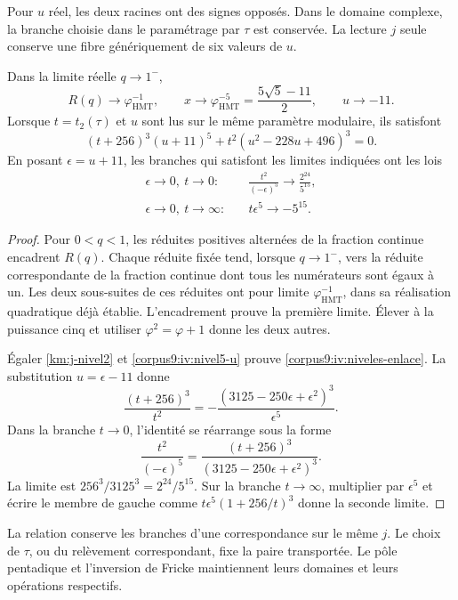 Pour \(u\) réel, les deux racines ont des signes opposés. Dans le
domaine complexe, la branche choisie dans le paramétrage
par \(\tau\) est conservée. La lecture \(j\) seule conserve une fibre
génériquement de six valeurs de \(u\).


\begin{proposition}
\label{corpus9:iv:niveles-ramas}
Dans la limite réelle \(q\to1^-\),
\[
 R(q)\longrightarrow\varphi_{\mathrm{HMT}}^{-1},\qquad
 x\longrightarrow\varphi_{\mathrm{HMT}}^{-5}
     =\frac{5\sqrt5-11}{2},\qquad u\longrightarrow-11.
\]
Lorsque \(t=t_2(\tau)\) et \(u\) sont lus sur le même paramètre
modulaire, ils satisfont
\begin{equation}
 (t+256)^3(u+11)^5
   +t^2(u^2-228u+496)^3=0.
 \label{corpus9:iv:niveles-enlace}
\end{equation}
En posant \(\epsilon=u+11\), les branches qui satisfont les limites
indiquées ont les lois
\begin{align}
 \epsilon\to0,\ t\to0:
 &\quad \frac{t^2}{(-\epsilon)^5}\longrightarrow
          \frac{2^{24}}{5^{15}},\\
 \epsilon\to0,\ t\to\infty:
 &\quad t\epsilon^5\longrightarrow-5^{15}.
 \label{corpus9:iv:niveles-asintotica}
\end{align}
\end{proposition}
\begin{proof}
Pour \(0<q<1\), les réduites positives alternées de la
fraction continue encadrent \(R(q)\). Chaque réduite fixée
tend, lorsque \(q\to1^-\), vers la réduite correspondante de
la fraction continue dont tous les numérateurs sont égaux à un.
Les deux sous-suites de ces réduites ont pour limite
\(\varphi_{\mathrm{HMT}}^{-1}\), dans sa réalisation quadratique
déjà établie. L’encadrement prouve la première limite. Élever à
la puissance cinq et utiliser \(\varphi^2=\varphi+1\) donne les
deux autres.


Égaler \eqref{km:j-nivel2} et \eqref{corpus9:iv:nivel5-u}
prouve \eqref{corpus9:iv:niveles-enlace}. La substitution
\(u=\epsilon-11\) donne
\[
 \frac{(t+256)^3}{t^2}
   =-\frac{(3125-250\epsilon+\epsilon^2)^3}{\epsilon^5}.
\]
Dans la branche \(t\to0\), l’identité se réarrange sous la forme
\[
 \frac{t^2}{(-\epsilon)^5}
   =\frac{(t+256)^3}{(3125-250\epsilon+\epsilon^2)^3}.
\]
La limite est \(256^3/3125^3=2^{24}/5^{15}\).
Sur la branche \(t\to\infty\), multiplier par \(\epsilon^5\)
et écrire le membre de gauche comme
\(t\epsilon^5(1+256/t)^3\) donne la seconde limite.
\end{proof}

La relation conserve les branches d’une correspondance sur le
même \(j\). Le choix de \(\tau\), ou du relèvement
correspondant, fixe la paire transportée. Le pôle
pentadique et l’inversion de Fricke maintiennent leurs domaines et leurs
opérations respectifs.
